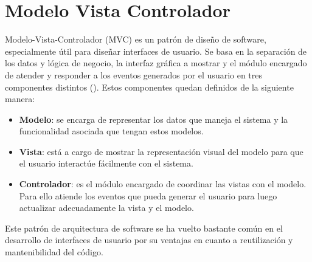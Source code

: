 \section{Modelo Vista Controlador}
Modelo-Vista-Controlador (MVC) es un patrón de diseño de software, especialmente útil
para diseñar interfaces de usuario. Se basa en la separación de los datos y lógica de
negocio, la interfaz gráfica a mostrar y el módulo encargado de atender y responder a
los eventos generados por el usuario en tres componentes distintos (\cite{MVC}). Estos
componentes quedan definidos de la siguiente manera:

\begin{itemize}
  \item \textbf{Modelo}: se encarga de representar los datos que maneja el sistema y
  la funcionalidad asociada que tengan estos modelos.
  \item \textbf{Vista}: está a cargo de mostrar la representación visual del modelo
  para que el usuario interactúe fácilmente con el sistema.
  \item \textbf{Controlador}: es el módulo encargado de coordinar las vistas con el modelo.
  Para ello atiende los eventos que pueda generar el usuario para luego actualizar
  adecuadamente la vista y el modelo.
\end{itemize}

Este patrón de arquitectura de software se ha vuelto bastante común en el desarrollo
de interfaces de usuario por su ventajas en cuanto a reutilización y mantenibilidad
del código.
